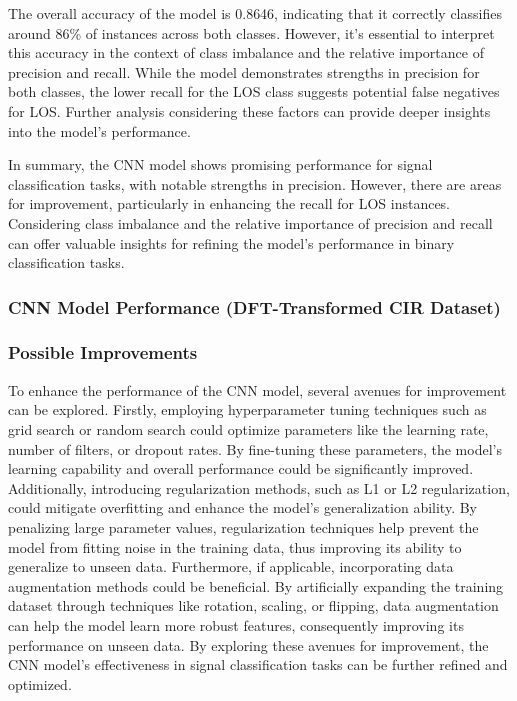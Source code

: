 The overall accuracy of the model is 0.8646, indicating that it correctly classifies around 86\% of instances across both classes. However, it's essential to interpret this accuracy in the context of class imbalance and the relative importance of precision and recall. While the model demonstrates strengths in precision for both classes, the lower recall for the LOS class suggests potential false negatives for LOS. Further analysis considering these factors can provide deeper insights into the model's performance.

In summary, the CNN model shows promising performance for signal classification tasks, with notable strengths in precision. However, there are areas for improvement, particularly in enhancing the recall for LOS instances. Considering class imbalance and the relative importance of precision and recall can offer valuable insights for refining the model's performance in binary classification tasks.

\subsubsection{CNN Model Performance (DFT-Transformed CIR Dataset)}



\subsubsection{Possible Improvements}

To enhance the performance of the CNN model, several avenues for improvement can be explored. Firstly, employing hyperparameter tuning techniques such as grid search or random search could optimize parameters like the learning rate, number of filters, or dropout rates. By fine-tuning these parameters, the model's learning capability and overall performance could be significantly improved. Additionally, introducing regularization methods, such as L1 or L2 regularization, could mitigate overfitting and enhance the model's generalization ability. By penalizing large parameter values, regularization techniques help prevent the model from fitting noise in the training data, thus improving its ability to generalize to unseen data. Furthermore, if applicable, incorporating data augmentation methods could be beneficial. By artificially expanding the training dataset through techniques like rotation, scaling, or flipping, data augmentation can help the model learn more robust features, consequently improving its performance on unseen data. By exploring these avenues for improvement, the CNN model's effectiveness in signal classification tasks can be further refined and optimized.

